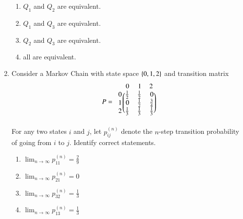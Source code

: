 \begin{enumerate}[label=\thesection.\arabic*.,ref=\thesection.\theenumi]
\begin{enumerate}
\item $Q_1$ and $Q_2$ are equivalent.
\item $Q_1$ and $Q_3$ are equivalent.
\item $Q_2$ and $Q_3$ are equivalent.
\item all are equivalent.
\end{enumerate}
\solution

\item Consider a Markov Chain with state space $\left\{0,1,2\right\}$ and transition matrix
\begin{align}
P = 
\begin{blockarray}{c@{\hspace{1pt}}rrr@{\hspace{3pt}}}
         & 0   & 1   & 2 \\
        \begin{block}{r@{\hspace{3pt}}@{\hspace{1pt}}
    (@{\hspace{1pt}}rrr@{\hspace{1pt}}@{\hspace{1pt}})}
        0 & \frac{1}{2} & \frac{1}{2} & 0  \\
        1 & 0 &\frac{1}{2}  & \frac{3}{4}  \\
%
        2 &  \frac{1}{3} & \frac{1}{3} & \frac{1}{3}  \\
        \end{block}
    \end{blockarray}
\end{align}
For any two states $i$ and $j$, let $p_{ij}^{(n)}$ denote the $n$-step transition probability of going from $i$ to $j$.  Identify correct statements.
\begin{enumerate}
\item $\lim_{n \to \infty} p_{11}^{(n)} = \frac{2}{9}$
\item $\lim_{n \to \infty} p_{21}^{(n)} = 0$
\item $\lim_{n \to \infty} p_{32}^{(n)} = \frac{1}{3}$
\item $\lim_{n \to \infty} p_{13}^{(n)} = \frac{1}{3}$
\end{enumerate}

\end{enumerate}
